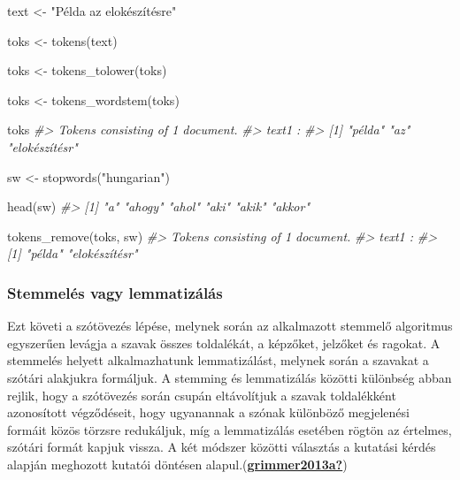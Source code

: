 \documentclass[
]{book}
\newenvironment{Shaded}{\begin{snugshade}}{\end{snugshade}}
\newcommand{\CommentTok}[1]{\textcolor[rgb]{0.56,0.35,0.01}{\textit{#1}}}
\newcommand{\FunctionTok}[1]{\textcolor[rgb]{0.00,0.00,0.00}{#1}}
\newcommand{\NormalTok}[1]{#1}
\newcommand{\OtherTok}[1]{\textcolor[rgb]{0.56,0.35,0.01}{#1}}
\newcommand{\StringTok}[1]{\textcolor[rgb]{0.31,0.60,0.02}{#1}}
\begin{document}
\begin{Shaded}
\begin{Highlighting}[]

\NormalTok{text }\OtherTok{\textless{}{-}} \StringTok{"Példa az elokészítésre"}

\NormalTok{toks }\OtherTok{\textless{}{-}} \FunctionTok{tokens}\NormalTok{(text)}

\NormalTok{toks }\OtherTok{\textless{}{-}} \FunctionTok{tokens\_tolower}\NormalTok{(toks)}

\NormalTok{toks }\OtherTok{\textless{}{-}} \FunctionTok{tokens\_wordstem}\NormalTok{(toks)}

\NormalTok{toks}
\CommentTok{\#\textgreater{} Tokens consisting of 1 document.}
\CommentTok{\#\textgreater{} text1 :}
\CommentTok{\#\textgreater{} [1] "példa"        "az"           "elokészítésr"}

\NormalTok{sw }\OtherTok{\textless{}{-}} \FunctionTok{stopwords}\NormalTok{(}\StringTok{"hungarian"}\NormalTok{)}

\FunctionTok{head}\NormalTok{(sw)}
\CommentTok{\#\textgreater{} [1] "a"     "ahogy" "ahol"  "aki"   "akik"  "akkor"}

\FunctionTok{tokens\_remove}\NormalTok{(toks, sw)}
\CommentTok{\#\textgreater{} Tokens consisting of 1 document.}
\CommentTok{\#\textgreater{} text1 :}
\CommentTok{\#\textgreater{} [1] "példa"        "elokészítésr"}
\end{Highlighting}
\end{Shaded}

\hypertarget{stemmeluxe9s-vagy-lemmatizuxe1luxe1s}{%
\subsubsection{Stemmelés vagy
lemmatizálás}\label{stemmeluxe9s-vagy-lemmatizuxe1luxe1s}}

Ezt követi a szótövezés lépése, melynek során az alkalmazott stemmelő
algoritmus egyszerűen levágja a szavak összes toldalékát, a képzőket,
jelzőket és ragokat. A stemmelés helyett alkalmazhatunk lemmatizálást,
melynek során a szavakat a szótári alakjukra formáljuk. A stemming és
lemmatizálás közötti különbség abban rejlik, hogy a szótövezés során
csupán eltávolítjuk a szavak toldalékként azonosított végződéseit, hogy
ugyanannak a szónak különböző megjelenési formáit közös törzsre
redukáljuk, míg a lemmatizálás esetében rögtön az értelmes, szótári
formát kapjuk vissza. A két módszer közötti választás a kutatási kérdés
alapján meghozott kutatói döntésen
alapul.(\protect\hyperlink{ref-grimmer2013a}{\textbf{grimmer2013a?}})
\end{document}
